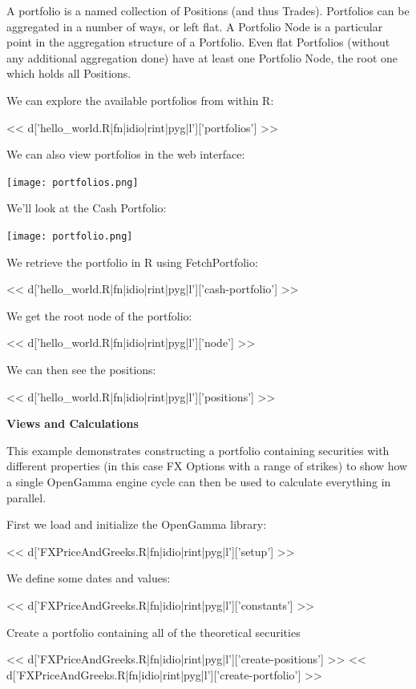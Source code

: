 \documentclass[custom, plainsections]{sciposter}
\begin{document}
\begin{multicols*}{2}
A portfolio is a named collection of Positions (and thus Trades). Portfolios can be aggregated in a number of ways, or left flat. A Portfolio Node is a particular point in the aggregation structure of a Portfolio. Even flat Portfolios (without any additional aggregation done) have at least one Portfolio Node, the root one which holds all Positions.

We can explore the available portfolios from within R:

<< d['hello_world.R|fn|idio|rint|pyg|l']['portfolios'] >>

We can also view portfolios in the web interface:

\vspace{0.5cm}
\texttt{[image: portfolios.png]}
\vspace{0.5cm}

We'll look at the Cash Portfolio:

\vspace{0.5cm}
\texttt{[image: portfolio.png]}
\vspace{0.5cm}

We retrieve the portfolio in R using FetchPortfolio:

<< d['hello_world.R|fn|idio|rint|pyg|l']['cash-portfolio'] >>

We get the root node of the portfolio:

<< d['hello_world.R|fn|idio|rint|pyg|l']['node'] >>

We can then see the positions:

<< d['hello_world.R|fn|idio|rint|pyg|l']['positions'] >>

\vfill
\pagebreak

\textbf{Views and Calculations}
\label{sec:views}

This example demonstrates constructing a portfolio containing securities with different properties (in this case FX Options with a range of strikes) to show how a single OpenGamma engine cycle can then be used to calculate everything in parallel.

First we load and initialize the OpenGamma library:

<< d['FXPriceAndGreeks.R|fn|idio|rint|pyg|l']['setup'] >>

We define some dates and values:

<< d['FXPriceAndGreeks.R|fn|idio|rint|pyg|l']['constants'] >>

Create a portfolio containing all of the theoretical securities

<< d['FXPriceAndGreeks.R|fn|idio|rint|pyg|l']['create-positions'] >>
<< d['FXPriceAndGreeks.R|fn|idio|rint|pyg|l']['create-portfolio'] >>


\end{multicols*}
\end{document}
